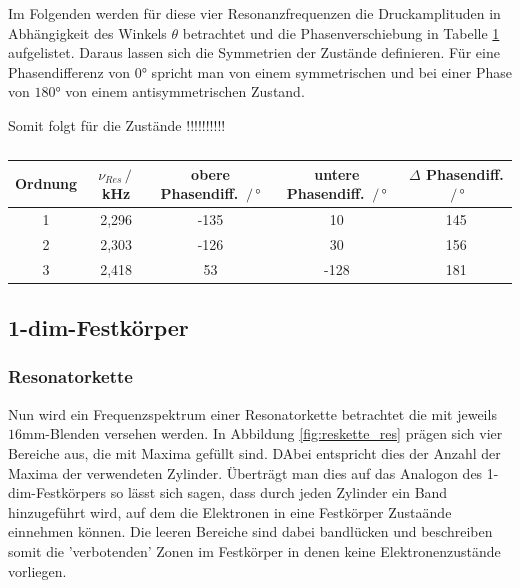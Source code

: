 Im Folgenden werden für diese vier Resonanzfrequenzen die Druckamplituden in Abhängigkeit des Winkels $\theta$ betrachtet und die Phasenverschiebung in Tabelle \ref{tab:mol_diff} aufgelistet.
Daraus lassen sich die Symmetrien der Zustände definieren. Für eine Phasendifferenz von $0°$ spricht man von einem symmetrischen und bei einer Phase von $180°$ von einem antisymmetrischen Zustand.
\begin{figure}[H]
    \centering
    \hfil
    \hfil 
    
    \hfil
    \caption{}
    \label{fig:polarplots}
\end{figure}
Somit folgt für die Zustände !!!!!!!!!!

\begin{table}
    \center
    \caption{}
    \begin{tabular}{c| c c c c}
        \toprule
        Ordnung & $\nu_{Res}\,/\,$kHz & obere Phasendiff. $\,/\,°$ & untere Phasendiff. $\,/\,°$ & $\Delta$ Phasendiff. $\,/\,°$\\
        \midrule
        1 &2,296 &-135 &10 &145 \\
        2 &2,303 &-126 &30 &156 \\
        3 &2,418 &53 &-128 &181 \\
        \bottomrule
    \end{tabular}
    \label{tab:mol_diff}
\end{table}

\subsection{1-dim-Festkörper}
\subsubsection*{Resonatorkette}
Nun wird ein Frequenzspektrum einer Resonatorkette betrachtet die mit jeweils $16$mm-Blenden versehen werden.
In Abbildung \ref{fig:reskette_res} prägen sich vier Bereiche aus, die mit Maxima gefüllt sind. DAbei entspricht dies der Anzahl der Maxima der verwendeten Zylinder.
Überträgt man dies auf das Analogon des 1-dim-Festkörpers so lässt sich sagen, dass durch jeden Zylinder ein Band hinzugeführt wird, auf dem die Elektronen
in eine Festkörper Zustaände einnehmen können. Die leeren Bereiche sind dabei bandlücken und beschreiben somit die 'verbotenden' Zonen im Festkörper in denen keine Elektronenzustände vorliegen.


